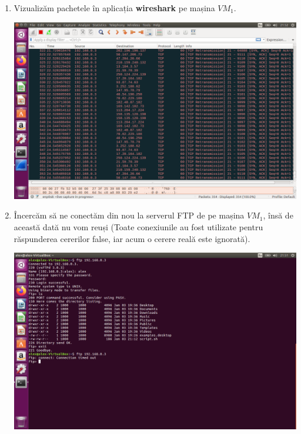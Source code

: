 \documentclass[a4paper]{article}
\begin{document}
\begin{enumerate}
    \item Vizualizăm pachetele în aplicația \textbf{wireshark} pe mașina $ VM_1 $.
    
    \begin{center}
        \hspace*{-1.8cm}                                           \includegraphics[scale=0.64]{"./img/pas6.png"}       
    \end{center}
    
    \item Încercăm să ne conectăm din nou la serverul FTP de pe mașina $ VM_1 $, însă de această dată nu vom reuși (Toate conexiunile au fost utilizate pentru răspunderea cererilor false, iar acum o cerere reală este ignorată).
    
    \begin{center}
        \hspace*{-1.8cm}                                          \includegraphics[scale=0.64]{"./img/pas5.png"}       
    \end{center}
    

\end{enumerate}
\end{document}
